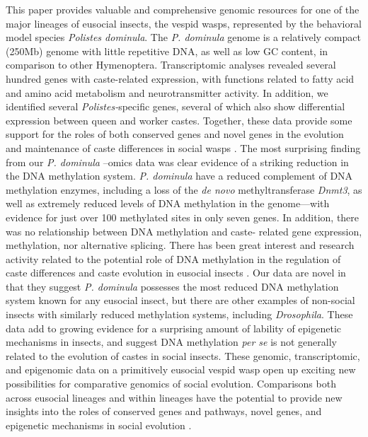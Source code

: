 This paper provides valuable and comprehensive genomic resources for one
of the major lineages of eusocial insects, the vespid wasps, represented
by the behavioral model species \textit{Polistes dominula}. The \textit{P.
dominula} genome is a relatively compact (250Mb) genome with little
repetitive DNA, as well as low GC content, in comparison to other
Hymenoptera. Transcriptomic analyses revealed several hundred genes with
caste-related expression, with functions related to fatty acid and amino
acid metabolism and neurotransmitter activity. In addition, we
identified several \textit{Polistes-}specific genes, several of which also
show differential expression between queen and worker castes. Together,
these data provide some support for the roles of both conserved genes
and novel genes in the evolution and maintenance of caste differences in
social wasps \cite{SumnerTRG,TothRobinson2007}. The most
surprising finding from our \textit{P. dominula} --omics data was clear
evidence of a striking reduction in the DNA methylation system. \textit{P.
dominula} have a reduced complement of DNA methylation enzymes,
including a loss of the \textit{de novo} methyltransferase \textit{Dnmt3},
as well as extremely reduced levels of DNA methylation in the
genome---with evidence for just over 100 methylated sites in only seven
genes. In addition, there was no relationship between DNA methylation
and caste- related gene expression, methylation, nor alternative
splicing. There has been great interest and research activity related to
the potential role of DNA methylation in the regulation of caste
differences and caste evolution in eusocial insects \cite{Kucharski2008,Weiner2012}.
Our data are
novel in that they suggest \textit{P. dominula} possesses the most reduced
DNA methylation system known for any eusocial insect, but there are
other examples of non-social insects with similarly reduced methylation
systems, including \textit{Drosophila}. These data add to growing evidence
for a surprising amount of lability of epigenetic mechanisms in insects,
and suggest DNA methylation \textit{per se} is not generally related to
the evolution of castes in social insects. These genomic,
transcriptomic, and epigenomic data on a primitively eusocial vespid
wasp open up exciting new possibilities for comparative genomics of
social evolution. Comparisons both across eusocial lineages and within
lineages have the potential to provide new insights into the roles of
conserved genes and pathways, novel genes, and epigenetic mechanisms in
social evolution \cite{Rehan2015}.

